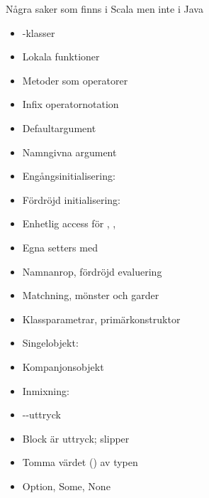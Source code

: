 \begin{Slide}{Några saker som finns i Scala men inte i Java}\SlideFontSmall
\vspace{-1em}\begin{multicols}{2}
\begin{itemize}
\item {}-klasser

\item Lokala funktioner

\item Metoder som operatorer

\item Infix operatornotation

\item Defaultargument

\item Namngivna argument

\item Engångsinitialisering: 

\item Fördröjd initialisering: 

\item Enhetlig access för , , 

\item Egna setters med 

\item Namnanrop, fördröjd evaluering

\item Matchning, mönster och garder

\item Klassparametrar, primärkonstruktor

\item Singelobjekt: 

\item Kompanjonsobjekt

\item Inmixning: 

\item {}--uttryck

\item Block är uttryck; slipper 

\item Tomma värdet () av typen 

\item Option, Some, None


\end{itemize}
\end{multicols}
\end{Slide}
